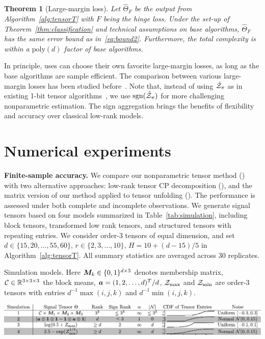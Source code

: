 \documentclass{article}
\theoremstyle{plain}
\newtheorem{thm}{Theorem}
\theoremstyle{definition}
\def\sign{\textup{sgn}}
\def\CPT{\text{\bf \footnotesize CPT}}
\def\NonParaM{\text{\bf \footnotesize NonparaM}}
\def\NonParaT{\text{\bf \footnotesize NonparaT}}
\begin{document}
\begin{thm}[Large-margin loss]\label{thm:hinge}Let $\hat \Theta_F$ be the output from Algorithm~\ref{alg:tensorT} with $F$ being the hinge loss. Under the set-up of Theorem~\ref{thm:classification} and technical assumptions on base algorithms, $\hat \Theta_F$ has the same error bound as in~\eqref{eq:bound2}. Furthermore, the total complexity is within a $\text{poly}(d)$ factor of base algorithms. 
\end{thm}
In principle, uses can choose their own favorite large-margin losses, as long as the base algorithms are sample efficient. The comparison between various large-margin losses has been studied before~\cite{bartlett2006convexity}. Note that, instead of using $\hat {\mathcal{Z}}_\pi$ as in existing 1-bit tensor algorithms~\cite{ghadermarzy2018learning,wang2018learning}, we use $\sign(\hat \tZ_\pi)$ for more challenging nonparametric estimation. The sign aggregation brings the benefits of flexibility and accuracy over classical low-rank models. 

\vspace{-.1cm}
\section{Numerical experiments}\label{sec:simulation}
\vspace{-.2cm}

{\bf Finite-sample accuracy.} We compare our nonparametric tensor method (\NonParaT) with two alternative approaches: low-rank tensor CP decomposition (\CPT), and the matrix version of our method applied to tensor unfolding (\NonParaM). The performance is assessed under both complete and incomplete observations.  We generate signal tensors based on four models summarized in Table~\ref{tab:simulation}, including block tensors, transformed low rank tensors, and structured tensors with repeating entries. We consider order-3  tensors of equal dimension, and set $d\in \{15, 20,\ldots,55,60\}$, $r\in\{2,3,\ldots,10\}$, $H=10+{(d-15)/ 5}$ in Algorithm~\ref{alg:tensorT}. All summary statistics are averaged across $30$ replicates. 

\vspace{-.3cm}
\begin{table}[h]
\captionsetup{font=footnotesize}
\caption{Simulation models. Here $\bm M_k\in\{0,1\}^{d\times 3}$ denotes membership matrix, $\mathcal{C}\in\mathbb{R}^{3\times 3\times 3}$ the block means, $\bm{a}=(1,2,\ldots,d)^T/d$, $\mathcal{Z}_{\max}$ and $\mathcal{Z}_{\min}$ are order-3 tensors with entries $d^{-1}\max(i,j,k)$ and $d^{-1}\min(i,j,k)$.}\label{tab:simulation}
\vspace{.1cm}
\includegraphics[width=\textwidth]{figure/simulation2.pdf}
\end{table}
\vspace{-.1cm}
\end{document}
